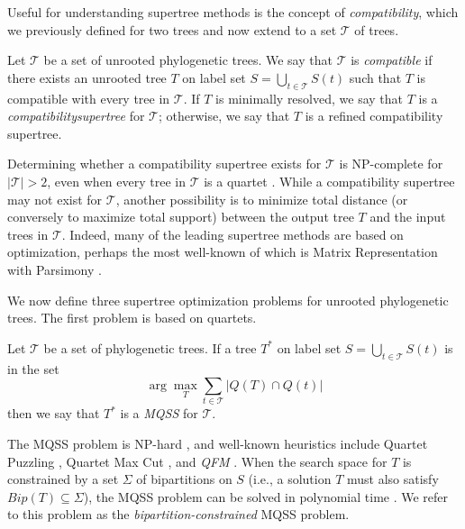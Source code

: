 Useful for understanding supertree methods is the concept of \emph{\gls{compatibility}}, which we previously defined for two trees and now extend to a set $\mathcal{T}$ of trees.

\begin{definition}
\label{def:compatibility-supertree}
Let $\mathcal{T}$ be a set of unrooted phylogenetic trees.
We say that $\mathcal{T}$ is \emph{\gls{compatible}} if there exists an unrooted tree $T$ on label set $S = \bigcup_{t \in \mathcal{T}} S(t)$ such that $T$ is compatible with every tree in $\mathcal{T}$.
If $T$ is minimally resolved, we say that $T$ is a \emph{\gls{compatibilitysupertree}} for $\mathcal{T}$; otherwise, we say that $T$ is a refined compatibility supertree.
\end{definition}

Determining whether a compatibility supertree exists for $\mathcal{T}$ is NP-complete for $| \mathcal{T} | > 2$, even when every tree in $\mathcal{T}$ is a \gls{quartet} \cite{bodlaender1992two, steel1992complexity}.
While a compatibility supertree may not exist for $\mathcal{T}$, another possibility is to minimize total distance (or conversely to maximize total support) between the output tree $T$ and the input trees in $\mathcal{T}$.
Indeed, many of the leading supertree methods are based on optimization, perhaps the most well-known of which is Matrix Representation with Parsimony \cite{ragan1992phylo-mrp}.

We now define three supertree optimization problems for unrooted phylogenetic trees.
The first problem is based on quartets.

\begin{definition}
\label{def:mqss}
Let $\mathcal{T}$ be a set of phylogenetic trees.
If a tree $T^*$ on label set $S = \bigcup_{t \in \mathcal{T}} S(t)$ is in the set
\begin{equation}
	 \arg \max_T \sum_{t \in \mathcal{T}} | Q(T) \cap Q(t) |
\end{equation}
then we say that $T^*$ is a \emph{\gls{MQSS}} for $\mathcal{T}$.
\end{definition}
The MQSS problem is NP-hard \cite{jiang2001polynomial, lafond2016on}, and well-known heuristics include Quartet Puzzling \cite{strimmer1996quartet}, Quartet Max Cut \cite{snir2012quartet}, and \textit{\gls{QFM}} \cite{reaz2014accurate}.
When the search space for $T$ is constrained by a set $\Sigma$ of \glspl{bipartition} on $S$ (i.e., a solution $T$ must also satisfy $Bip(T) \subseteq \Sigma$), the MQSS problem can be solved in polynomial time \cite{bryant2001constructing, mirarab2014astral}.
We refer to this problem as the \textit{\gls{bipartition-constrained}} MQSS problem.

